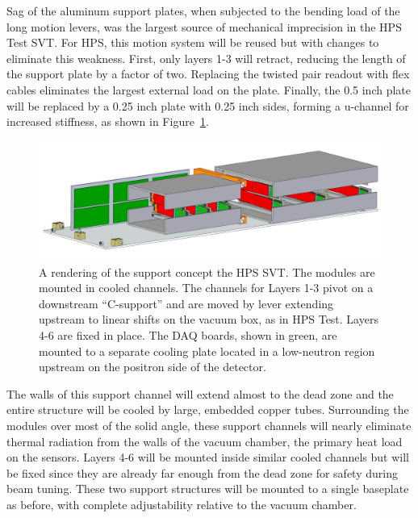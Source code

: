 Sag of the aluminum support plates, when subjected to the bending load of the long motion levers, was the largest source of mechanical imprecision in the HPS Test SVT.  For HPS, this motion system will be reused but with changes to eliminate this weakness. First, only layers 1-3 will retract, reducing the length of the support plate by a factor of two.  Replacing the twisted pair readout with flex cables eliminates the largest external load on the plate.  Finally, the 0.5 inch plate will be replaced by a 0.25 inch plate with 0.25 inch sides, forming a u-channel for increased stiffness, as shown in Figure~\ref{fig:newsupport}. 
\begin{figure}[ht]
    \includegraphics[width=\textwidth]{svt/figures/10dec8}
\caption{\small{A rendering of the support concept the HPS SVT.  The modules are mounted in cooled channels.  The channels for Layers 1-3 pivot on a downstream ``C-support'' and are moved by lever extending upstream to linear shifts on the vacuum box, as in HPS Test.  Layers 4-6 are fixed in place. The DAQ boards, shown in green, are mounted to a separate cooling plate located in a low-neutron region upstream on the positron side of the detector.} }
\label{fig:newsupport}
\end{figure}
The walls of this support channel will extend almost to the dead zone and the entire structure will be cooled by large, embedded copper tubes. Surrounding the modules over most of the solid angle, these support channels will nearly eliminate thermal radiation from the walls of the vacuum chamber, the primary heat load on the sensors.  Layers 4-6 will be mounted inside similar cooled channels but will be fixed since they are already far enough from the dead zone for safety during beam tuning. These two support structures will be mounted to a single baseplate as before, with complete adjustability relative to the vacuum chamber.  

